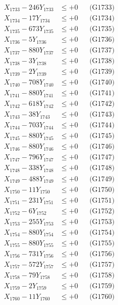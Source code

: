\documentclass[a4paper,10pt]{article}
\begin{document}
{\begin{align}
X_{1733} - 246Y_{1733} &\leq +0 && \text{(G1733)} \\
X_{1734} - 17Y_{1734} &\leq +0 && \text{(G1734)} \\
X_{1735} - 673Y_{1735} &\leq +0 && \text{(G1735)} \\
X_{1736} - 5Y_{1736} &\leq +0 && \text{(G1736)} \\
X_{1737} - 880Y_{1737} &\leq +0 && \text{(G1737)} \\
X_{1738} - 3Y_{1738} &\leq +0 && \text{(G1738)} \\
X_{1739} - 2Y_{1739} &\leq +0 && \text{(G1739)} \\
X_{1740} - 708Y_{1740} &\leq +0 && \text{(G1740)} \\
\allowbreak
X_{1741} - 880Y_{1741} &\leq +0 && \text{(G1741)} \\
X_{1742} - 618Y_{1742} &\leq +0 && \text{(G1742)} \\
X_{1743} - 38Y_{1743} &\leq +0 && \text{(G1743)} \\
X_{1744} - 703Y_{1744} &\leq +0 && \text{(G1744)} \\
X_{1745} - 880Y_{1745} &\leq +0 && \text{(G1745)} \\
X_{1746} - 880Y_{1746} &\leq +0 && \text{(G1746)} \\
X_{1747} - 796Y_{1747} &\leq +0 && \text{(G1747)} \\
X_{1748} - 338Y_{1748} &\leq +0 && \text{(G1748)} \\
X_{1749} - 488Y_{1749} &\leq +0 && \text{(G1749)} \\
X_{1750} - 11Y_{1750} &\leq +0 && \text{(G1750)} \\
\allowbreak
X_{1751} - 231Y_{1751} &\leq +0 && \text{(G1751)} \\
X_{1752} - 6Y_{1752} &\leq +0 && \text{(G1752)} \\
X_{1753} - 255Y_{1753} &\leq +0 && \text{(G1753)} \\
X_{1754} - 880Y_{1754} &\leq +0 && \text{(G1754)} \\
X_{1755} - 880Y_{1755} &\leq +0 && \text{(G1755)} \\
X_{1756} - 731Y_{1756} &\leq +0 && \text{(G1756)} \\
X_{1757} - 572Y_{1757} &\leq +0 && \text{(G1757)} \\
X_{1758} - 79Y_{1758} &\leq +0 && \text{(G1758)} \\
X_{1759} - 2Y_{1759} &\leq +0 && \text{(G1759)} \\
X_{1760} - 11Y_{1760} &\leq +0 && \text{(G1760)} \\

\end{align}}
\end{document}
